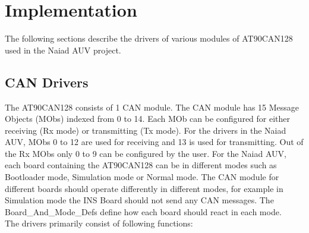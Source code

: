 \section{Implementation}\label{sec:implementation}
The following sections describe the drivers of various modules of AT90CAN128 used in the Naiad AUV project.
\subsection{CAN Drivers}
The AT90CAN128 consists of 1 CAN module. The CAN module has 15 Message Objects (MObs) indexed from 0 to 14. Each MOb can be configured for either receiving (Rx mode) or transmitting (Tx mode). For the drivers in the Naiad AUV, MObs 0 to 12 are used for receiving and 13 is used for transmitting. Out of the Rx MObs only 0 to 9 can be configured by the user. For the Naiad AUV, each board containing the AT90CAN128 can be in different modes such as Bootloader mode, Simulation mode or Normal mode. The CAN module for different boards should operate differently in different modes, for example in Simulation mode the INS Board should not send any CAN messages. The Board\_And\_Mode\_Defs define how each board should react in each mode. \\
The drivers primarily consist of following functions:

